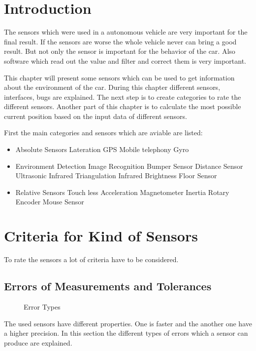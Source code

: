 \section{Introduction}\label{sec:positioningIntroduction}
The sensors which were used in a autonomous vehicle are very important for the final result.
If the sensors are worse the whole vehicle never can bring a good result.
But not only the sensor is important for the behavior of the car.
Also software which read out the value and filter and correct them is very important.

This chapter will present some sensors which can be used to get information about the environment of the car.
During this chapter different sensors, interfaces, bugs are explained.
The next step is to create categories to rate the different sensors.
Another part of this chapter is to calculate the most possible current position based on the input data of different sensors.

First the main categories and sensors which are aviable are listed:
\begin{itemize}
\item Absolute Sensors
	\subitem Lateration
		\subsubitem GPS	
		\subsubitem Mobile telephony
	\subitem Gyro
\item Environment Detection
	\subitem Image Recognition
	\subitem Bumper Sensor
	\subitem Distance Sensor
		\subsubitem Ultrasonic
		\subsubitem Infrared Triangulation
		\subsubitem Infrared Brightness
	\subitem Floor Sensor
\item Relative Sensors
	\subitem Touch less
		\subsubitem Acceleration
		\subsubitem Magnetometer
	\subitem Inertia
		\subsubitem Rotary Encoder
		\subsubitem Mouse Sensor
\end{itemize}


\section{Criteria for Kind of Sensors}
To rate the sensors a lot of criteria have to be considered.


\subsection{Errors of Measurements and Tolerances}
\begin{figure}

\caption{Error Types}
\label{fig:errorTypes}
\end{figure}
The used sensors have different properties.
One is faster and the another one have a higher precision.
In this section the different types of errors which a sensor can produce are explained.


